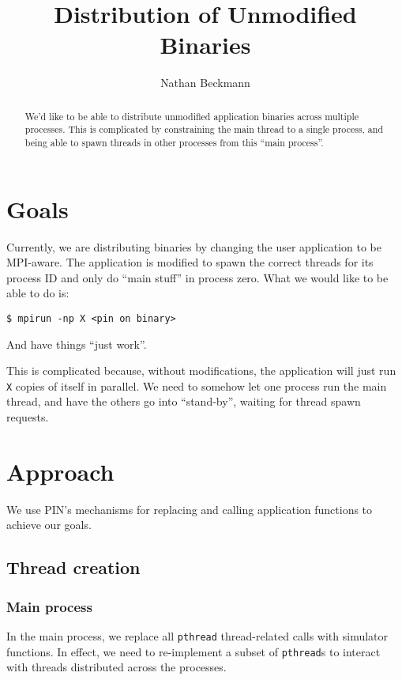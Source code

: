 \documentclass[10pt,twocolumn]{article}
\title{Distribution of Unmodified Binaries}
\author{Nathan Beckmann}
\begin{document}
\maketitle

\begin{abstract}
  We'd like to be able to distribute unmodified application binaries
  across multiple processes. This is complicated by constraining the
  main thread to a single process, and being able to spawn threads in
  other processes from this ``main process''.
\end{abstract}

\section{Goals}
\label{sec:goals}

Currently, we are distributing binaries by changing the user
application to be MPI-aware. The application is modified to spawn the
correct threads for its process ID and only do ``main stuff'' in
process zero. What we would like to be able to do is:
\begin{verbatim}
$ mpirun -np X <pin on binary>
\end{verbatim}
And have things ``just work''.

This is complicated because, without modifications, the application
will just run \texttt{X} copies of itself in parallel. We need to
somehow let one process run the main thread, and have the others go
into ``stand-by'', waiting for thread spawn requests.

\section{Approach}
\label{sec:approach}

We use PIN's mechanisms for replacing and calling application
functions to achieve our goals.

\subsection{Thread creation}
\label{sec:thread-creation}

\subsubsection{Main process}
\label{sec:main-process}

In the main process, we replace all \texttt{pthread} thread-related
calls with simulator functions. In effect, we need to re-implement a
subset of \texttt{pthread}s to interact with threads distributed
across the processes.
\end{document}

